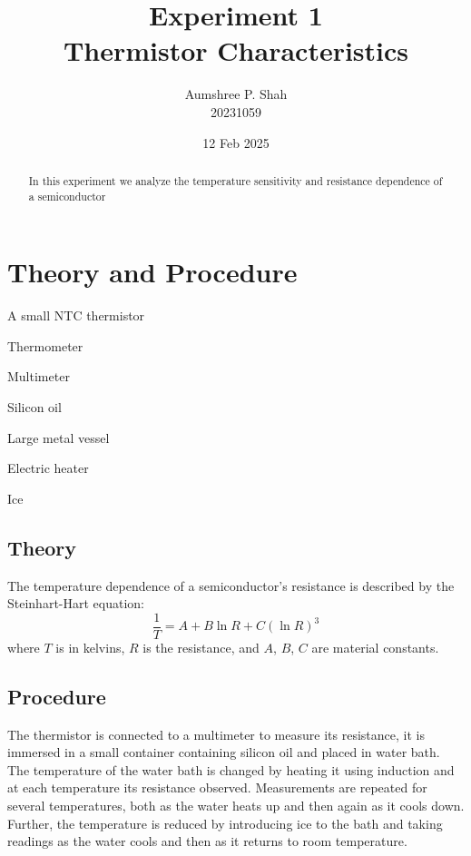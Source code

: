 \documentclass[%
 sor,
 jor,
 amsmath,amssymb,
 reprint,%
]{revtex4-2}
\begin{document}

\title{Experiment 1\\Thermistor Characteristics}

\author{Aumshree P. Shah\\20231059\color{red}}
\altaffiliation[\color{red}]{aumshree.pinkalbenshah@students.iiserpune.ac.in}
\date{12 Feb 2025}

\begin{abstract}
\centering
In this experiment we analyze the temperature sensitivity and resistance dependence of a semiconductor
\end{abstract}


\maketitle
\section{Theory and Procedure}

{\small
\begin{itemize}
\begin{minipage}[t]{0.45\textwidth}
    \item A small NTC thermistor
    \item Thermometer
    \item Multimeter
    \item Silicon oil
\end{minipage}
\hfill
\begin{minipage}[t]{0.45\textwidth}
    \item Large metal vessel 
    \item Electric heater
    \item Ice
\end{minipage}
\end{itemize}
}

\subsection{Theory}
The temperature dependence of a semiconductor's resistance is described by the Steinhart-Hart equation:
\[
\frac{1}{T} = A + B\ln R + C(\ln R)^3
\]
where $T$ is in kelvins, $R$ is the resistance, and $A$, $B$, $C$ are material constants.

\subsection{Procedure}
The thermistor is connected to a multimeter to measure its resistance, it is immersed in a small container containing silicon oil and placed in water bath. The temperature of the water bath is changed by heating it using induction and at each temperature its resistance observed. Measurements are repeated for several temperatures, both as the water heats up and then again as it cools down. Further, the temperature is reduced by introducing ice to the bath and taking readings as the water cools and then as it returns to room temperature.
\pagebreak
\end{document}
